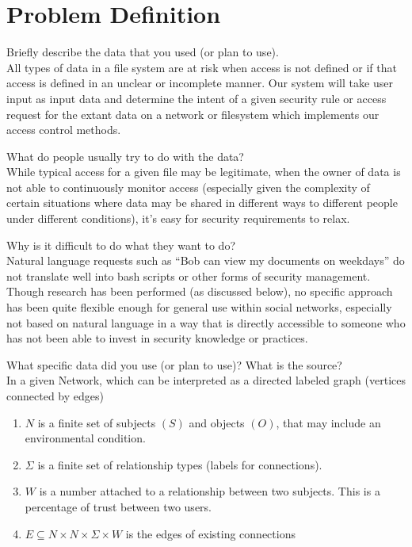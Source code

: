 \documentclass[12pt]{article}
\begin{document}
\section{Problem Definition}
Briefly describe the data that you used (or plan to use).\\ 
All types of data in a file system are at risk when access is not defined or if that access is defined in an unclear or incomplete manner. 
Our system will take user input as input data and determine the intent of a given security rule or access request for the extant data on a network or filesystem which implements our access control methods.

What do people usually try to do with the data? \\
While typical access for a given file may be legitimate, when the owner of data is not able to continuously monitor access (especially given the complexity of certain situations where data may be shared in different ways to different people under different conditions), it’s easy for security requirements to relax. 

Why is it difficult to do what they want to do? \\
Natural language requests such as “Bob can view my documents on weekdays” do not translate well into bash scripts or other forms of security management.
Though research has been performed (as discussed below), no specific approach has been quite flexible enough for general use within social networks, especially not based on natural language in a way that is directly accessible to someone who has not been able to invest in security knowledge or practices.

What specific data did you use (or plan to use)? What is the source? \\
In a given Network, which can be interpreted as a directed labeled graph (vertices connected by edges)
\begin{enumerate}
    \item $N$ is a finite set of subjects $(S)$ and objects $(O)$, that may include an environmental condition.
    \item $\Sigma$ is a finite set of relationship types (labels for connections).
    \item $W$ is a number attached to a relationship between two subjects. This is a percentage of trust between two users.
    \item $E \subseteq N \times N \times \Sigma \times W$ is the edges of existing connections
\end{enumerate}
\end{document}

